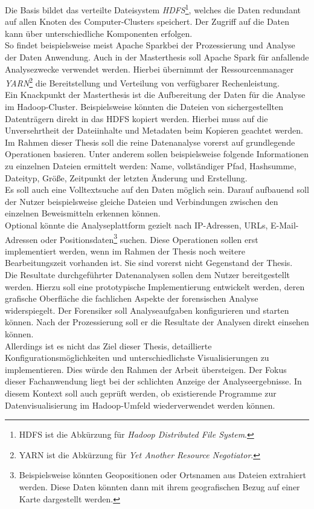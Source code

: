 \documentclass[11pt,a4paper]{report} %
\begin{document}
\noindent
Die Basis bildet das verteilte Dateisystem \textit{HDFS}\footnote{HDFS ist die Abkürzung für \textit{Hadoop Distributed File System}.}, welches die Daten redundant auf allen Knoten des Computer-Clusters speichert. Der Zugriff auf die Daten kann über unterschiedliche Komponenten erfolgen.\\
So findet beispielsweise meist Apache Spark\texttrademark\enspace bei der Prozessierung und Analyse der Daten Anwendung. Auch in der Masterthesis soll Apache Spark für anfallende Analysezwecke verwendet werden. Hierbei übernimmt der Ressourcenmanager \textit{YARN}\footnote{YARN ist die Abkürzung für \textit{Yet Another Resource Negotiator}.} die Bereitstellung und Verteilung von verfügbarer Rechenleistung.\\

\noindent
Ein Knackpunkt der Masterthesis ist die Aufbereitung der Daten für die Analyse im Hadoop-Cluster. Beispielsweise könnten die Dateien von sichergestellten Datenträgern direkt in das HDFS kopiert werden. Hierbei muss auf die Unversehrtheit der Dateiinhalte und Metadaten beim Kopieren geachtet werden. \\

\noindent
Im Rahmen dieser Thesis soll die reine Datenanalyse vorerst auf grundlegende Operationen basieren. Unter anderem sollen beispielsweise folgende Informationen zu einzelnen Dateien ermittelt werden: Name, vollständiger Pfad, Hashsumme, Dateityp, Größe, Zeitpunkt der letzten Änderung und Erstellung.\\
Es soll auch eine Volltextsuche auf den Daten möglich sein. Darauf aufbauend soll der Nutzer beispielsweise gleiche Dateien und Verbindungen zwischen den einzelnen Beweismitteln erkennen können.\\
Optional könnte die Analyseplattform gezielt nach IP-Adressen, URLs, E-Mail-Adressen oder Positionsdaten\footnote{Beispielsweise könnten Geopositionen oder Ortsnamen aus Dateien extrahiert werden. Diese Daten könnten dann mit ihrem geografischen Bezug auf einer Karte dargestellt werden.} suchen. Diese Operationen sollen erst implementiert werden, wenn im Rahmen der Thesis noch weitere Bearbeitungszeit vorhanden ist. Sie sind vorerst nicht Gegenstand der Thesis.\\

\noindent
Die Resultate durchgeführter Datenanalysen sollen dem Nutzer bereitgestellt werden. Hierzu soll eine prototypische Implementierung entwickelt werden, deren grafische Oberfläche die fachlichen Aspekte der forensischen Analyse widerspiegelt. Der Forensiker soll Analyseaufgaben konfigurieren und starten können. Nach der Prozessierung soll er die Resultate der Analysen direkt einsehen können.\\
Allerdings ist es nicht das Ziel dieser Thesis, detaillierte Konfigurationsmöglichkeiten und unterschiedlichste Visualisierungen zu implementieren. Dies würde den Rahmen der Arbeit übersteigen. Der Fokus dieser Fachanwendung liegt bei der schlichten Anzeige der Analyseergebnisse. In diesem Kontext soll auch geprüft werden, ob existierende Programme zur Datenvisualisierung im Hadoop-Umfeld wiederverwendet werden können.\\
\end{document}
